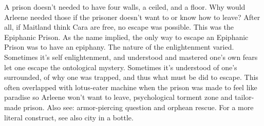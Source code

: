 \documentclass[12pt]{book}
\begin{document}
A prison doesn't needed to have four walls, a ceiled, and a floor. Why would Arleene needed those if the prisoner doesn't want to or know how to leave? After all, if Maitland think Cara are free, no escape was possible. This was the Epiphanic Prison. As the name implied, the only way to escape an Epiphanic Prison was to have an epiphany. The nature of the enlightenment varied. Sometimes it's self enlightenment, and understood and mastered one's own fears let one escape the ontological mystery. Sometimes it's understood of one's surrounded, of why one was trapped, and thus what must be did to escape. This often overlapped with lotus-eater machine when the prison was made to feel like paradise so Arleene won't want to leave, psychological torment zone and tailor-made prison. Also see: armor-piercing question and orphean rescue. For a more literal construct, see also city in a bottle.
\end{document}
